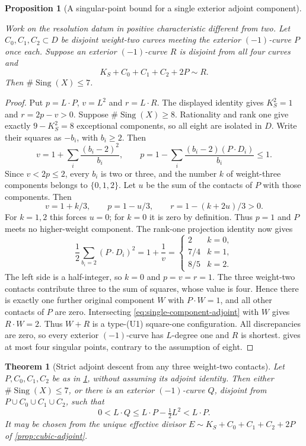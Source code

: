 \documentclass[11pt,reqno]{amsart}
\newtheorem{theorem}{Theorem}[section]
\newtheorem{proposition}[proposition]{Proposition}
\theoremstyle{definition}
\theoremstyle{remark}
\DeclareMathOperator{\Sing}{Sing}
\numberwithin{equation}{section}
\begin{document}
\begin{proposition}[A singular-point bound for a single exterior adjoint component]
\label{prop:three-contact-single-component}

Work on the resolution datum in positive characteristic different from two.
Let $C_0,C_1,C_2\subset D$ be disjoint weight-two curves meeting the
exterior $(-1)$-curve $P$ once each. Suppose an exterior $(-1)$-curve
$R$ is disjoint from all four curves and
\begin{equation}\label{eq:single-component-adjoint}
 K_S+C_0+C_1+C_2+2P\sim R.
\end{equation}
Then $\#\Sing(X)\le7$. 
\end{proposition}

\begin{proof}
Put $p=L\cdot P$, $v=L^2$ and $r=L\cdot R$.
The displayed identity gives $K_S^2=1$ and $r=2p-v>0$.
Suppose $\#\Sing(X)\ge8$. Rationality and rank one give exactly
$9-K_S^2=8$ exceptional components, so all eight are isolated in $D$.
Write their squares as $-b_i$, with $b_i\ge2$. Then
\[
 v=1+\sum_i\frac{(b_i-2)^2}{b_i},\qquad
 p=1-\sum_i\frac{(b_i-2)(P\cdot D_i)}{b_i}\le1.
\]
Since $v<2p\le2$, every $b_i$ is two or three, and the number $k$
of weight-three components belongs to $\{0,1,2\}$.
Let $u$ be the sum of the contacts of $P$ with those components.
Then
\[
 v=1+k/3,\qquad p=1-u/3,\qquad r=1-(k+2u)/3>0.
\]
For $k=1,2$ this forces $u=0$; for $k=0$ it is zero by definition.
Thus $p=1$ and $P$ meets no higher-weight component.
The rank-one projection identity now gives
\[
 \frac12\sum_{b_i=2}(P\cdot D_i)^2=1+\frac1v
 =\begin{cases}2&k=0,\\7/4&k=1,\\8/5&k=2.\end{cases}
\]
The left side is a half-integer, so $k=0$ and $p=v=r=1$.
The three weight-two contacts contribute three to the sum of squares, whose
value is four. Hence there is exactly one further original component $W$
with $P\cdot W=1$, and all other contacts of $P$ are zero.
Intersecting \eqref{eq:single-component-adjoint} with $W$
gives $R\cdot W=2$. Thus $W+R$ is a type-\textup{(U1)} square-one configuration.
All discrepancies are zero, so every exterior $(-1)$-curve has
$L$-degree one and $R$ is shortest.
 gives at most four singular
points, contrary to the assumption of eight.
\end{proof}

\begin{theorem}[Strict adjoint descent from any three weight-two contacts]
\label{thm:three-contact-descent}
Let $P,C_0,C_1,C_2$ be as in
\cref{prop:three-contact-single-component}, without assuming its adjoint identity.
Then either $\#\Sing(X)\le7$, or there is an exterior
$(-1)$-curve $Q$, disjoint from $P\cup C_0\cup C_1\cup C_2$, such that
\begin{equation}\label{eq:three-end-linear-descent}
 0<L\cdot Q\le L\cdot P-\tfrac12 L^2<L\cdot P.
\end{equation}
It may be chosen from the unique effective divisor
$E\sim K_S+C_0+C_1+C_2+2P$ of
\cref{prop:cubic-adjoint}.

\end{theorem}
\end{document}
